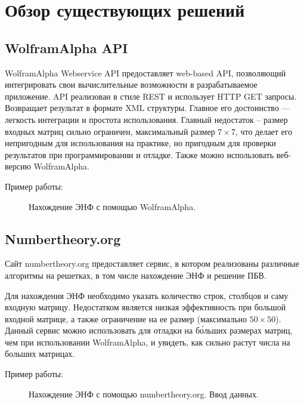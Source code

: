 \newpage

\section{Обзор существующих решений}

\subsection{WolframAlpha API}

WolframAlpha Webservice API\cite{WolframAlpha} предоставляет web-based API, позволяющий интегрировать свои вычислительные возможности в разрабатываемое приложение. API реализован в стиле REST и использует HTTP GET запросы. Возвращает результат в формате XML структуры. Главное его достоинство --- легкость интеграции и простота использования. Главный недостаток -- размер входных матриц сильно ограничен, максимальный размер $ 7 \times 7 $, что делает его непригодным для использования на практике, но пригодным для проверки результатов при программировании и отладке. Также можно использовать веб-версию WolframAlpha.

Пример работы:

\begin{figure}[H]
\caption{Нахождение ЭНФ с помощью WolframAlpha.}
\label{fig:HNF_WA}
\end{figure}

\subsection{Numbertheory.org}

Сайт numbertheory.org предоставляет сервис\cite{NumberTheory}, в котором реализованы различные алгоритмы на решетках, в том числе нахождение ЭНФ и решение ПБВ. 

Для нахождения ЭНФ необходимо указать количество строк, столбцов и саму входную матрицу. Недостатком является низкая эффективность при большой входной матрице, а также ограничение на ее размер (максимально $ 50 \times 50 $). Данный сервис можно использовать для отладки на б\'ольших размерах матриц, чем при использовании WolframAlpha, и увидеть, как сильно растут числа на больших матрицах.

Пример работы:

\begin{figure}[H]
\caption{Нахождение ЭНФ с помощью numbertheory.org. Ввод данных.}
\label{fig:HNF_NT_INPUT}
\end{figure}


